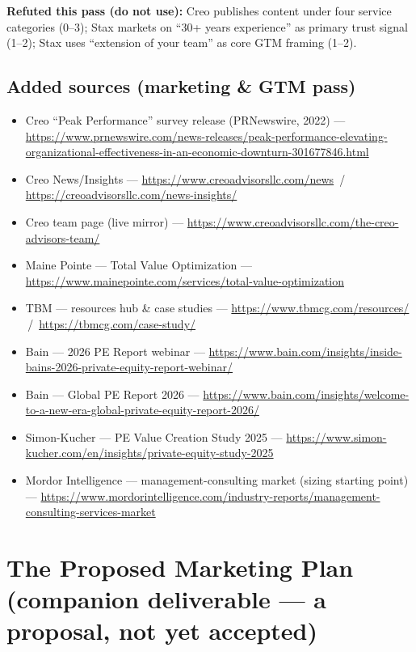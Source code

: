 \documentclass[11pt]{article}
\begin{document}
\noindent\textbf{Refuted this pass (do not use):} Creo publishes content under four service
categories (0--3); Stax markets on ``30+ years experience'' as primary trust signal (1--2);
Stax uses ``extension of your team'' as core GTM framing (1--2).

\subsection*{Added sources (marketing \& GTM pass)}
\small
\begin{itemize}
  \item Creo ``Peak Performance'' survey release (PRNewswire, 2022) --- \url{https://www.prnewswire.com/news-releases/peak-performance-elevating-organizational-effectiveness-in-an-economic-downturn-301677846.html}
  \item Creo News/Insights --- \url{https://www.creoadvisorsllc.com/news} \,/\, \url{https://creoadvisorsllc.com/news-insights/}
  \item Creo team page (live mirror) --- \url{https://www.creoadvisorsllc.com/the-creo-advisors-team/}
  \item Maine Pointe --- Total Value Optimization --- \url{https://www.mainepointe.com/services/total-value-optimization}
  \item TBM --- resources hub \& case studies --- \url{https://www.tbmcg.com/resources/} \,/\, \url{https://tbmcg.com/case-study/}
  \item Bain --- 2026 PE Report webinar --- \url{https://www.bain.com/insights/inside-bains-2026-private-equity-report-webinar/}
  \item Bain --- Global PE Report 2026 --- \url{https://www.bain.com/insights/welcome-to-a-new-era-global-private-equity-report-2026/}
  \item Simon-Kucher --- PE Value Creation Study 2025 --- \url{https://www.simon-kucher.com/en/insights/private-equity-study-2025}
  \item Mordor Intelligence --- management-consulting market (sizing starting point) --- \url{https://www.mordorintelligence.com/industry-reports/management-consulting-services-market}
\end{itemize}

\section{The Proposed Marketing Plan \textnormal{\small(companion deliverable --- a proposal, not yet accepted)}}
\end{document}
